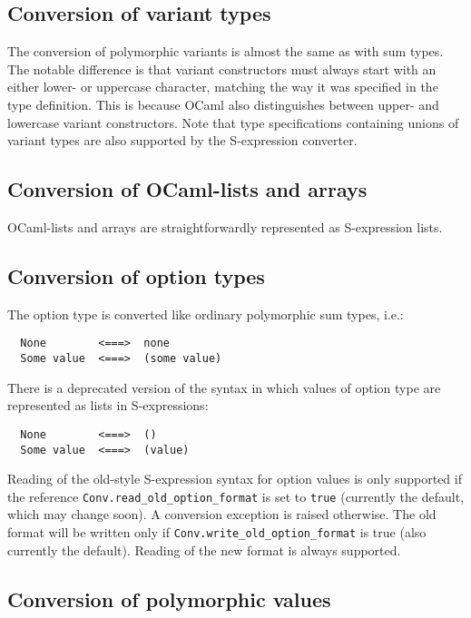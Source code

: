 \documentclass[a4paper]{article}
\begin{document}
\subsection{Conversion of variant types}

The conversion of polymorphic variants is almost the same as with
sum types.  The notable difference is that variant constructors must
always start with an either lower- or uppercase character, matching
the way it was specified in the type definition.  This is because OCaml
also distinguishes between upper- and lowercase variant constructors.
Note that type specifications containing unions of variant types are
also supported by the S-expression converter.

\subsection{Conversion of OCaml-lists and arrays}

OCaml-lists and arrays are straightforwardly represented as S-expression
lists.

\subsection{Conversion of option types}

The option type is converted like ordinary polymorphic sum types, i.e.:

\begin{verbatim}
  None        <===>  none
  Some value  <===>  (some value)
\end{verbatim}

There is a deprecated version of the syntax in which values of option
type are represented as lists in S-expressions:

\begin{verbatim}
  None        <===>  ()
  Some value  <===>  (value)
\end{verbatim}

Reading of the old-style S-expression syntax for option values is only
supported if the reference \verb=Conv.read_old_option_format= is set to
\verb=true= (currently the default, which may change soon).  A conversion
exception is raised otherwise.  The old format will be written only if
\verb=Conv.write_old_option_format= is true (also currently the default).
Reading of the new format is always supported.

\subsection{Conversion of polymorphic values}
\end{document}

